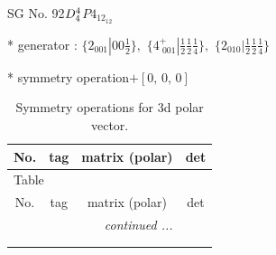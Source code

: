 \documentclass[fleqn,8pt]{jsarticle}
\begin{document}
\setcounter{MaxMatrixCols}{32}

\renewcommand{\tablename}{Table~}
\renewcommand{\figurename}{Figure~}
\begin{center}
\LARGE
SG No. 92\quad$D_{\rm 4}^{4}$\quad$P4_12_12$\quad[ tetragonal ]
\end{center}

* generator : $\{2{}_{001}|0 0 \frac{1}{2}\},\,\,\{4^{+}_{\,\,001}|\frac{1}{2} \frac{1}{2} \frac{1}{4}\},\,\,\{2{}_{010}|\frac{1}{2} \frac{1}{2} \frac{1}{4}\}$

* symmetry operation\quad$+\left[ 0,\, 0,\, 0 \right]$
\renewcommand{\arraystretch}{1.3}
\begin{longtable}{cccc}
\caption{Symmetry operations for 3d polar vector.}
 \\
 \hline \hline
No. & tag & matrix (polar) & det \\ \hline \endfirsthead

\multicolumn{3}{l}{\tablename\ \thetable{}} \\
 \hline \hline
No. & tag & matrix (polar) & det \\ \hline \endhead

 \hline \hline
\multicolumn{3}{r}{\footnotesize\it continued ...} \\ \endfoot

 \hline \hline
\multicolumn{3}{r}{} \\ \endlastfoot


\end{longtable}
\end{document}
